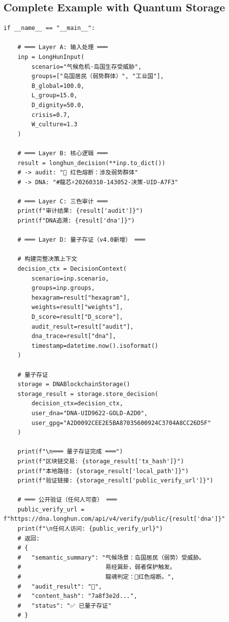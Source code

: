
\subsection{Complete Example with Quantum Storage}
\label{ssec:example-v4}

\begin{lstlisting}[style=python,
  caption={龍魂v4.0完整执行示例：气候危机场景
    · DNA: \#龍芯⚡️2026-03-10-COMPLETE-v4.0},
  label={lst:example-v4}]
if __name__ == "__main__":
    
    # ═══ Layer A: 输入处理 ═══
    inp = LongHunInput(
        scenario="气候危机·岛国生存受威胁",
        groups=["岛国居民（弱势群体）", "工业国"],
        B_global=100.0,
        L_group=15.0,
        D_dignity=50.0,
        crisis=0.7,
        W_culture=1.3
    )
    
    # ═══ Layer B: 核心逻辑 ═══
    result = longhun_decision(**inp.to_dict())
    # -> audit: "🔴 红色熔断：涉及弱势群体"
    # -> DNA: "#龍芯⚡️20260310-143052-决策-UID-A7F3"
    
    # ═══ Layer C: 三色审计 ═══
    print(f"审计结果: {result['audit']}")
    print(f"DNA追溯: {result['dna']}")
    
    # ═══ Layer D: 量子存证（v4.0新增） ═══
    
    # 构建完整决策上下文
    decision_ctx = DecisionContext(
        scenario=inp.scenario,
        groups=inp.groups,
        hexagram=result["hexagram"],
        weights=result["weights"],
        D_score=result["D_score"],
        audit_result=result["audit"],
        dna_trace=result["dna"],
        timestamp=datetime.now().isoformat()
    )
    
    # 量子存证
    storage = DNABlockchainStorage()
    storage_result = storage.store_decision(
        decision_ctx=decision_ctx,
        user_dna="DNA-UID9622-GOLD-A2D0",
        user_gpg="A2D0092CEE2E5BA87035600924C3704A8CC26D5F"
    )
    
    print(f"\n═══ 量子存证完成 ═══")
    print(f"区块链交易: {storage_result['tx_hash']}")
    print(f"本地路径: {storage_result['local_path']}")
    print(f"验证链接: {storage_result['public_verify_url']}")
    
    # ═══ 公开验证（任何人可查） ═══
    public_verify_url = f"https://dna.longhun.com/api/v4/verify/public/{result['dna']}"
    print(f"\n任何人访问: {public_verify_url}")
    # 返回:
    # {
    #   "semantic_summary": "气候场景：岛国居民（弱势）受威胁。
    #                        易经巽卦，弱者保护触发。
    #                        龍魂判定：🔴红色熔断。",
    #   "audit_result": "🔴",
    #   "content_hash": "7a8f3e2d...",
    #   "status": "✅ 已量子存证"
    # }
    

\end{lstlisting}
